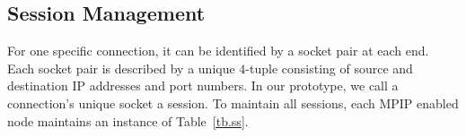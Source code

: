 %
%
%
%
%
%
%
%

%

\subsection{Session Management}
\label{sec:session}

For one specific connection, it can be identified by a socket pair at each end. Each socket pair is described by a unique $4$-tuple consisting of source and destination IP addresses and port numbers. In our prototype, we call a connection's unique socket a session. To maintain all sessions, each MPIP enabled node maintains an instance of Table~\ref{tb.ss}.

